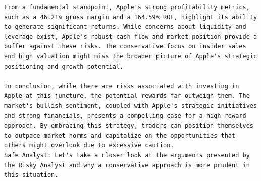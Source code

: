 \begin{tcolorbox}
\begin{lstlisting}[style=agentbase]
From a fundamental standpoint, Apple's strong profitability metrics, such as a 46.21% gross margin and a 164.59% ROE, highlight its ability to generate significant returns. While concerns about liquidity and leverage exist, Apple's robust cash flow and market position provide a buffer against these risks. The conservative focus on insider sales and high valuation might miss the broader picture of Apple's strategic positioning and growth potential.

In conclusion, while there are risks associated with investing in Apple at this juncture, the potential rewards far outweigh them. The market's bullish sentiment, coupled with Apple's strategic initiatives and strong financials, presents a compelling case for a high-reward approach. By embracing this strategy, traders can position themselves to outpace market norms and capitalize on the opportunities that others might overlook due to excessive caution.
Safe Analyst: Let's take a closer look at the arguments presented by the Risky Analyst and why a conservative approach is more prudent in this situation.
\end{lstlisting}
\end{tcolorbox}

